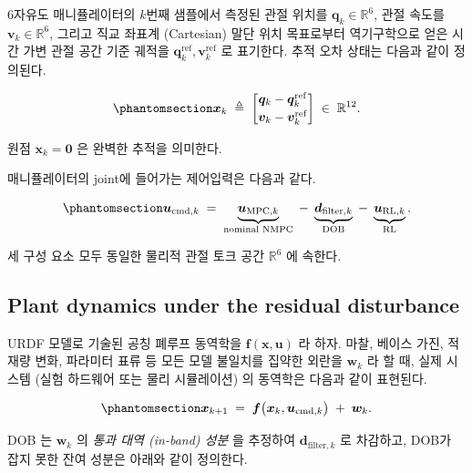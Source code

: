 \documentclass[
  11pt,
]{article}
\theoremstyle{plain}
\theoremstyle{plain}
\theoremstyle{definition}
\theoremstyle{remark}
\begin{document}
6자유도 매니퓰레이터의 \(k\)번째 샘플에서 측정된 관절 위치를
\(\bm{q}_k \in \mathbb{R}^6\), 관절 속도를
\(\bm{v}_k \in \mathbb{R}^6\), 그리고 직교 좌표계 (Cartesian) 말단 위치
목표로부터 역기구학으로 얻은 시간 가변 관절 공간 기준 궤적을
\(\bm{q}^{\mathrm{ref}}_k, \bm{v}^{\mathrm{ref}}_k\) 로 표기한다. 추적
오차 상태는 다음과 같이 정의된다.

\begin{equation}\protect\phantomsection\label{eq-state}{
\bm{x}_k \;\triangleq\;
\begin{bmatrix}
\bm{q}_k - \bm{q}^{\mathrm{ref}}_k \\[2pt]
\bm{v}_k - \bm{v}^{\mathrm{ref}}_k
\end{bmatrix}
\;\in\; \mathbb{R}^{12}.
}\end{equation}

원점 \(\bm{x}_k = \bm{0}\) 은 완벽한 추적을 의미한다.

매니퓰레이터의 joint에 들어가는 제어입력은 다음과 같다.

\begin{equation}\protect\phantomsection\label{eq-cmd}{
\bm{u}_{\mathrm{cmd},k}
\;=\;
\underbrace{\bm{u}_{\mathrm{MPC},k}}_{\text{nominal NMPC}}
\;-\;
\underbrace{\bm{d}_{\mathrm{filter},k}}_{\text{DOB}}
\;-\;
\underbrace{\bm{u}_{\mathrm{RL},k}}_{\text{RL}}.
}\end{equation}

세 구성 요소 모두 동일한 물리적 관절 토크 공간 \(\mathbb{R}^6\) 에
속한다.

\subsection{Plant dynamics under the residual
disturbance}\label{plant-dynamics-under-the-residual-disturbance}

URDF 모델로 기술된 공칭 폐루프 동역학을 \(\bm{f}(\bm{x},\bm{u})\) 라
하자. 마찰, 베이스 가진, 적재량 변화, 파라미터 표류 등 모든 모델
불일치를 집약한 외란을 \(\bm{w}_k\) 라 할 때, 실제 시스템 (실험 하드웨어
또는 물리 시뮬레이션) 의 동역학은 다음과 같이 표현된다.

\begin{equation}\protect\phantomsection\label{eq-plant}{
\bm{x}_{k+1} \;=\; \bm{f}\bigl(\bm{x}_k,\bm{u}_{\mathrm{cmd},k}\bigr)
\;+\; \bm{w}_k.
}\end{equation}

DOB 는 \(\bm{w}_k\) 의 \emph{통과 대역 (in-band) 성분} 을 추정하여
\(\bm{d}_{\mathrm{filter},k}\) 로 차감하고, DOB가 잡지 못한 잔여 성분은
아래와 같이 정의한다.
\end{document}

